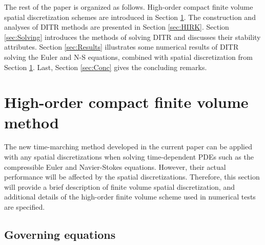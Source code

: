 \documentclass[preprint,12pt]{elsarticle}
\begin{document}

The rest of the paper is organized as follows.
High-order compact finite volume spatial  discretization schemes
are introduced in Section \ref{sec:CFV}. 
The construction and analyses of DITR methods are presented 
in Section \ref{sec:HIRK}.
Section \ref{sec:Solving} introduces the methods 
of solving DITR and discusses their stability attributes.
Section \ref{sec:Results} illustrates some numerical results of
DITR solving the Euler and N-S equations, combined with 
spatial  discretization from Section \ref{sec:CFV}. 
Last, Section \ref{sec:Conc} gives the concluding remarks.


\section{High-order compact finite volume method}
\label{sec:CFV}

\newcommand{\U}{\mathbf{U}}
\newcommand{\F}{\mathbf{F}}
\newcommand{\x}{\mathbf{x}}

The new time-marching method developed in
the current paper can be applied with 
any spatial discretizations when solving 
time-dependent PDEs such as the compressible Euler and Navier-Stokes
equations. 
However, their actual performance will be affected by
the spatial discretizations.
Therefore,
this section will provide a brief description of
finite volume spatial  discretization,
and additional details
of the high-order finite volume scheme
used in numerical tests are specified.

\subsection{Governing equations}
\label{ssec:GovEq}
\end{document}
